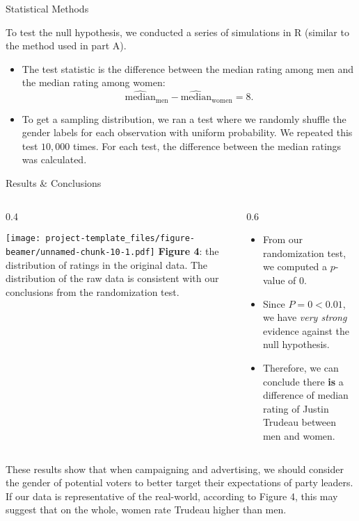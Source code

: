\documentclass[
  ignorenonframetext,
]{beamer}
\providecommand{\tightlist}{%
  \setlength{\itemsep}{0pt}\setlength{\parskip}{0pt}}
\def\begincols{\begin{columns}}
\def\begincol{\begin{column}}
\def\endcol{\end{column}}
\def\endcols{\end{columns}}
\begin{document}
\begin{frame}{Statistical Methods}
\protect\hypertarget{statistical-methods-1}{}

To test the null hypothesis, we conducted a series of simulations in R
(similar to the method used in part A).

\begin{itemize}
\tightlist
\item
  The test statistic is the difference between the median rating among
  men and the median rating among women:
  \[\hat{\text{median}}_\text{men}-\hat{\text{median}}_\text{women}=8.\]
\item
  To get a sampling distribution, we ran a test where we randomly
  shuffle the gender labels for each observation with uniform
  probability. We repeated this test \(10,000\) times. For each test,
  the difference between the median ratings was calculated.
\end{itemize}

\end{frame}

\begin{frame}[t]{Results \& Conclusions}
\protect\hypertarget{results-conclusions-1}{}

\begincols
\begincol{0.4\textwidth}
\fontsize{6}{7.2}\selectfont

\texttt{[image: project-template\_files/figure-beamer/unnamed-chunk-10-1.pdf]}
\textbf{Figure 4}: the distribution of ratings in the original data. The
distribution of the raw data is consistent with our conclusions from the
randomization test. \vspace{1em} \endcol \begincol{0.6\textwidth}

\begin{itemize}
\item From our randomization test, we computed a $p$-value of $0$.
\item Since $P=0<0.01$, we have \textit{very strong} evidence against the null hypothesis.
\item Therefore, we can conclude there \textbf{is} a difference of median rating of Justin Trudeau between men and women.
\end{itemize}
\endcol
\endcols

These results show that when campaigning and advertising, we should
consider the gender of potential voters to better target their
expectations of party leaders. If our data is representative of the
real-world, according to Figure 4, this may suggest that on the whole,
women rate Trudeau higher than men.

\end{frame}
\end{document}
